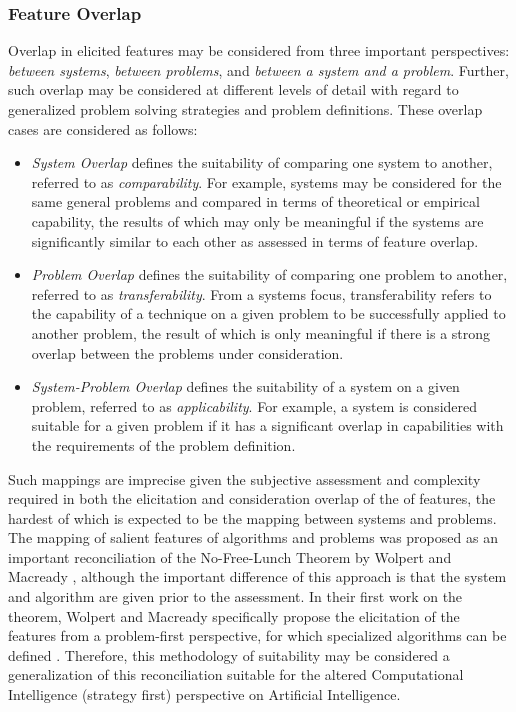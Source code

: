 \subsubsection{Feature Overlap}
Overlap in elicited features may be considered from three important perspectives: \emph{between systems}, \emph{between problems}, and \emph{between a system and a problem}. Further, such overlap may be considered at different levels of detail with regard to generalized problem solving strategies and problem definitions.
These overlap cases are considered as follows:

\begin{itemize}
	\item \emph{System Overlap} defines the suitability of comparing one system to another, referred to as \emph{comparability}. For example, systems may be considered for the same general problems and compared in terms of theoretical or empirical capability, the results of which may only be meaningful if the systems are significantly similar to each other as assessed in terms of feature overlap. 
	\item \emph{Problem Overlap} defines the suitability of comparing one problem to another, referred to as \emph{transferability}. From a systems focus, transferability refers to the capability of a technique on a given problem to be successfully applied to another problem, the result of which is only meaningful if there is a strong overlap between the problems under consideration.
	\item \emph{System-Problem Overlap} defines the suitability of a system on a given problem, referred to as \emph{applicability}. For example, a system is considered suitable for a given problem if it has a significant overlap in capabilities with the requirements of the problem definition.
\end{itemize}

Such mappings are imprecise given the subjective assessment and complexity required in both the elicitation and consideration overlap of the of features, the hardest of which is expected to be the mapping between systems and problems. 
The mapping of salient features of algorithms and problems was proposed as an important reconciliation of the No-Free-Lunch Theorem by Wolpert and Macready \cite{Wolpert1997}, although the important difference of this approach is that the system and algorithm are given prior to the assessment. In their first work on the theorem, Wolpert and Macready specifically propose the elicitation of the features from a problem-first perspective, for which specialized algorithms can be defined \cite{Wolpert1995}. Therefore, this methodology of suitability may be considered a generalization of this reconciliation suitable for the altered Computational Intelligence (strategy first) perspective on Artificial Intelligence.

